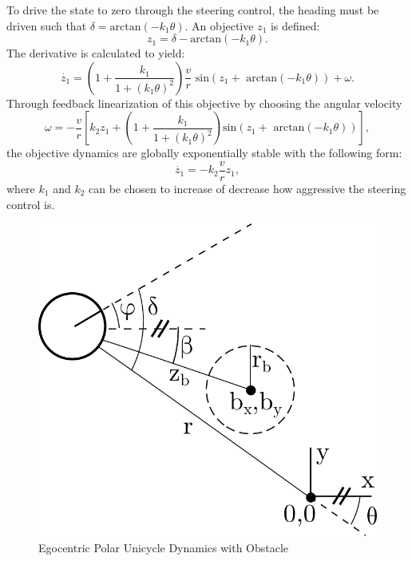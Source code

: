 \documentclass[journal]{IEEEtran}
\begin{document}
To drive the state to zero through the steering control, the heading must be driven such that $\delta = \text{arctan}(-k_1\theta).$ An objective $z_1$ is defined: 
\begin{equation}
z_1 = \delta - \text{arctan}(-k_1\theta).
\label{z1}
\end{equation} The derivative is calculated to yield:
\begin{equation}
\dot{z_1}=\left( 1+\frac{k_1}{1+(k_1\theta)^2}\right) \frac{v}{r}\text{ sin}(z_1+\text{ arctan}(-k_1\theta))+\omega.
\end{equation}
Through feedback linearization of this objective by choosing the angular velocity \begin{equation}\omega = -\frac{v}{r}\left[ k_2 z_1+\left( 1 + \frac{k_1}{1+(k_1\theta)^2} \right) \text{sin}(z_1+\text{ arctan}(-k_1\theta))\right] ,\end{equation} the objective dynamics are globally exponentially stable with the following form: \begin{equation} \dot{z_1}=-k_2\frac{v}{r}z_1,\end{equation} where $k_1$ and $k_2$ can be chosen to increase of decrease how aggressive the steering control is.

\begin{figure}[h!]
\begin{center}
\includegraphics[scale=0.45]{obs.pdf} 
\caption{Egocentric Polar Unicycle Dynamics with Obstacle\label{fig:obs}} 
\end{center}
\end{figure}
\end{document}
